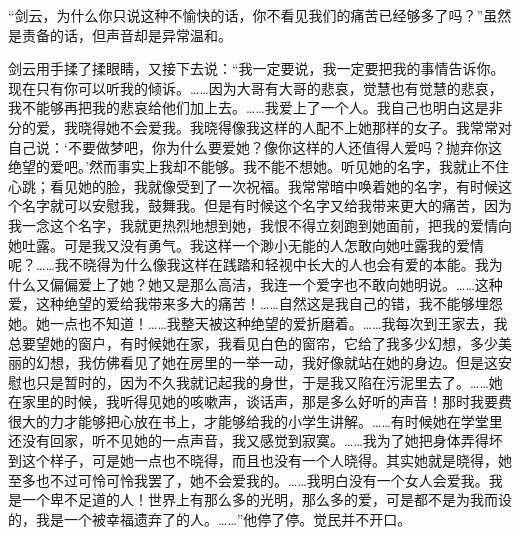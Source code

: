 \par “剑云，为什么你只说这种不愉快的话，你不看见我们的痛苦已经够多了吗？”虽然是责备的话，但声音却是异常温和。
\par 剑云用手揉了揉眼睛，又接下去说：“我一定要说，我一定要把我的事情告诉你。现在只有你可以听我的倾诉。……因为大哥有大哥的悲哀，觉慧也有觉慧的悲哀，我不能够再把我的悲哀给他们加上去。……我爱上了一个人。我自己也明白这是非分的爱，我晓得她不会爱我。我晓得像我这样的人配不上她那样的女子。我常常对自己说：‘不要做梦吧，你为什么要爱她？像你这样的人还值得人爱吗？抛弃你这绝望的爱吧。’然而事实上我却不能够。我不能不想她。听见她的名字，我就止不住心跳；看见她的脸，我就像受到了一次祝福。我常常暗中唤着她的名字，有时候这个名字就可以安慰我，鼓舞我。但是有时候这个名字又给我带来更大的痛苦，因为我一念这个名字，我就更热烈地想到她，我恨不得立刻跑到她面前，把我的爱情向她吐露。可是我又没有勇气。我这样一个渺小无能的人怎敢向她吐露我的爱情呢？……我不晓得为什么像我这样在践踏和轻视中长大的人也会有爱的本能。我为什么又偏偏爱上了她？她又是那么高洁，我连一个爱字也不敢向她明说。……这种爱，这种绝望的爱给我带来多大的痛苦！……自然这是我自己的错，我不能够埋怨她。她一点也不知道！……我整天被这种绝望的爱折磨着。……我每次到王家去，我总要望她的窗户，有时候她在家，我看见白色的窗帘，它给了我多少幻想，多少美丽的幻想，我仿佛看见了她在房里的一举一动，我好像就站在她的身边。但是这安慰也只是暂时的，因为不久我就记起我的身世，于是我又陷在污泥里去了。……她在家里的时候，我听得见她的咳嗽声，谈话声，那是多么好听的声音！那时我要费很大的力才能够把心放在书上，才能够给我的小学生讲解。……有时候她在学堂里还没有回家，听不见她的一点声音，我又感觉到寂寞。……我为了她把身体弄得坏到这个样子，可是她一点也不晓得，而且也没有一个人晓得。其实她就是晓得，她至多也不过可怜可怜我罢了，她不会爱我的。……我明白没有一个女人会爱我。我是一个卑不足道的人！世界上有那么多的光明，那么多的爱，可是都不是为我而设的，我是一个被幸福遗弃了的人。……”他停了停。觉民并不开口。
